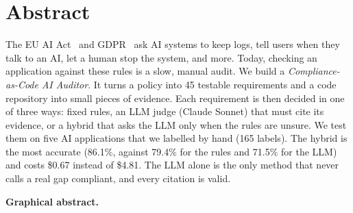 

\section*{Abstract}
\noindent
The EU AI Act~\cite{euaiact2024} and GDPR~\cite{gdpr2016} ask AI systems to keep logs, tell users when they talk to an
AI, let a human stop the system, and more. Today, checking an application against these rules is a slow, manual audit.
We build a \emph{Compliance-as-Code AI Auditor}. It turns a policy into 45 testable requirements and a code repository
into small pieces of evidence. Each requirement is then decided in one of three ways: fixed rules, an LLM judge (Claude
Sonnet) that must cite its evidence, or a hybrid that asks the LLM only when the rules are unsure. We test them on five
AI applications that we labelled by hand (165 labels). The hybrid is the most accurate (86.1\%, against 79.4\% for the
rules and 71.5\% for the LLM) and costs \$0.67 instead of \$4.81. The LLM alone is the only method that never calls a
real gap compliant, and every citation is valid.

\medskip\noindent
\textbf{Graphical abstract.}\\[0.3em]
\resizebox{\linewidth}{!}{\graphicalabstract}
